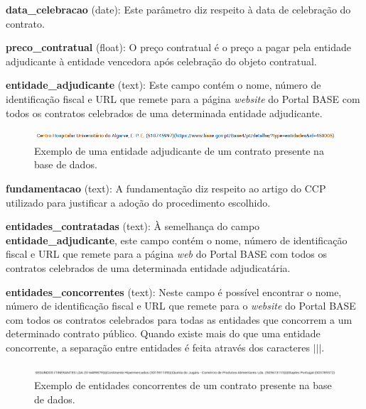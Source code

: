 \begin{my_itemize}
\item \textbf{data\_celebracao} (date): Este parâmetro diz respeito à data de celebração do contrato. 

\item \textbf{preco\_contratual} (float): O  preço contratual é o preço a pagar pela entidade adjudicante à entidade vencedora após celebração do objeto contratual. 

\item \textbf{entidade\_adjudicante} (text): Este campo contém o nome, número de identificação fiscal e URL que remete para a página \textit{website} do Portal BASE com todos os contratos celebrados de uma determinada entidade adjudicante. 

\begin{figure}[H]
	\centering
	\includegraphics[width=.9\textwidth]{imagens/adjudicante.png}
	\caption{Exemplo de uma entidade adjudicante de um contrato presente na base de dados.}
	\label{fig:adjudicante}
\end{figure}

\item \textbf{fundamentacao} (text): A fundamentação diz respeito ao artigo do CCP utilizado para justificar a adoção do procedimento escolhido. 

\item \textbf{entidades\_contratadas} (text): À semelhança do campo \textbf{entidade\_adjudicante}, este campo contém o nome, número de identificação fiscal e URL que remete para a página \textit{web} do Portal BASE com todos os contratos celebrados de uma determinada entidade adjudicatária. 

\item \textbf{entidades\_concorrentes} (text): Neste campo é possível encontrar o nome, número de identificação fiscal e URL que remete para o \textit{website} do Portal BASE com todos os contratos celebrados para todas as entidades que concorrem a um determinado contrato público. Quando existe mais do que uma entidade concorrente, a separação entre entidades é feita através dos caracteres \(|||\).



\begin{figure}[H]
	\centering
	\includegraphics[width=.9\textwidth]{imagens/concorrentes.png}
	\caption{Exemplo de entidades concorrentes de um contrato presente na base de dados.}
	\label{fig:concorrentes}
\end{figure}



\end{my_itemize}
